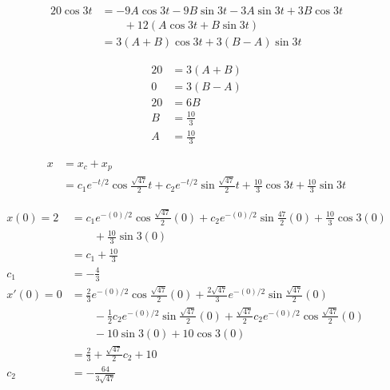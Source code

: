 \documentclass{article}
\begin{document}
\begin{align*}
  20 \cos 3t & = -9 A \cos 3t - 9 B \sin 3t - 3 A \sin 3t + 3 B \cos 3t \\
             & \qquad + 12 (A \cos 3t + B \sin 3t)                      \\
             & = 3 (A + B) \cos 3t + 3 (B - A) \sin 3t
\end{align*}

\begin{align*}
  20 & = 3 (A + B)    \\
  0  & = 3 (B - A)    \\
  20 & = 6 B          \\
  B  & = \frac{10}{3} \\
  A  & = \frac{10}{3}
\end{align*}

\begin{align*}
  x & = x_c + x_p                                                                                                                           \\
    & = c_1 e^{-t / 2} \cos \frac{\sqrt{47}}{2} t + c_2 e^{-t / 2} \sin \frac{\sqrt{47}}{2} t + \frac{10}{3} \cos 3t + \frac{10}{3} \sin 3t
\end{align*}

\begin{align*}
  x(0) = 2  & = c_1 e^{-(0) / 2} \cos \frac{\sqrt{47}}{2} (0) + c_2 e^{-(0) / 2} \sin \frac{47}{2} (0) + \frac{10}{3} \cos 3 (0)                     \\
            & \qquad + \frac{10}{3} \sin 3 (0)                                                                                                       \\
            & = c_1 + \frac{10}{3}                                                                                                                   \\
  c_1       & = -\frac{4}{3}                                                                                                                         \\
  x'(0) = 0 & = \frac{2}{3} e^{-(0) / 2} \cos \frac{\sqrt{47}}{2} (0) + \frac{2 \sqrt{47}}{3} e^{-(0) / 2} \sin \frac{\sqrt{47}}{2} (0)              \\
            & \qquad - \frac{1}{2} c_2 e^{-(0) / 2} \sin \frac{\sqrt{47}}{2} (0) + \frac{\sqrt{47}}{2} c_2 e^{-(0) / 2} \cos \frac{\sqrt{47}}{2} (0) \\
            & \qquad - 10 \sin 3 (0) + 10 \cos 3 (0)                                                                                                 \\
            & = \frac{2}{3} + \frac{\sqrt{47}}{2} c_2 + 10                                                                                           \\
  c_2       & = -\frac{64}{3 \sqrt{47}}
\end{align*}
\end{document}
